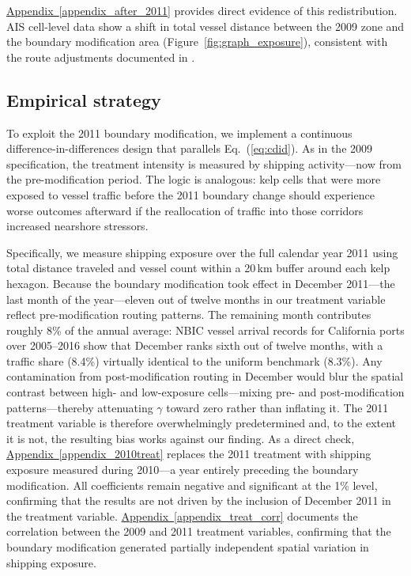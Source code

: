 \documentclass[12pt]{article}
\begin{document}
\hyperref[appendix_after_2011]{Appendix~\ref*{appendix_after_2011}} provides direct evidence of this redistribution. AIS cell-level data show a shift in total vessel distance between the 2009 zone and the boundary modification area (Figure~\ref{fig:graph_exposure}), consistent with the route adjustments documented in \citet{Klotz2022}.

\subsection{Empirical strategy}

To exploit the 2011 boundary modification, we implement a continuous difference-in-differences design that parallels Eq.~(\ref{eq:cdid}). As in the 2009 specification, the treatment intensity is measured by shipping activity---now from the pre-modification period. The logic is analogous: kelp cells that were more exposed to vessel traffic before the 2011 boundary change should experience worse outcomes afterward if the reallocation of traffic into those corridors increased nearshore stressors.

Specifically, we measure shipping exposure over the full calendar year 2011 using total distance traveled and vessel count within a 20\,km buffer around each kelp hexagon. Because the boundary modification took effect in December 2011---the last month of the year---eleven out of twelve months in our treatment variable reflect pre-modification routing patterns. The remaining month contributes roughly 8\% of the annual average: NBIC vessel arrival records for California ports over 2005--2016 show that December ranks sixth out of twelve months, with a traffic share (8.4\%) virtually identical to the uniform benchmark (8.3\%). Any contamination from post-modification routing in December would blur the spatial contrast between high- and low-exposure cells---mixing pre- and post-modification patterns---thereby attenuating $\gamma$ toward zero rather than inflating it. The 2011 treatment variable is therefore overwhelmingly predetermined and, to the extent it is not, the resulting bias works against our finding. As a direct check, \hyperref[appendix_2010treat]{Appendix~\ref*{appendix_2010treat}} replaces the 2011 treatment with shipping exposure measured during 2010---a year entirely preceding the boundary modification. All coefficients remain negative and significant at the 1\% level, confirming that the results are not driven by the inclusion of December 2011 in the treatment variable. \hyperref[appendix_treat_corr]{Appendix~\ref*{appendix_treat_corr}} documents the correlation between the 2009 and 2011 treatment variables, confirming that the boundary modification generated partially independent spatial variation in shipping exposure.
\end{document}
